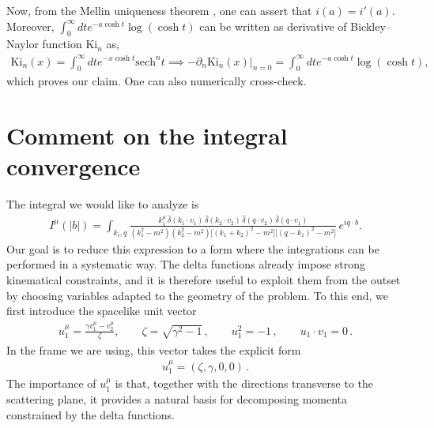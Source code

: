 Now, from the Mellin uniqueness theorem \cite{Butzer1997Mellin}, one can assert that $i(a)=i'(a)$.
Moreover, $\int_0^\infty dt e^{-a \cosh t}\log(\cosh t)$ can be written as derivative of Bickley–Naylor function $\textrm{Ki}_n$ as,
\begin{align}
    \textrm{Ki}_n(x)=\int_0^\infty dt e^{-x \cosh t} \textrm{sech}^nt\implies  -\partial_n\textrm{Ki}_n(x)|_{n=0}=\int_0^\infty dt e^{-a \cosh t}\log(\cosh t),
\end{align}
which proves our claim. One can also numerically cross-check.
\section{Comment on the integral convergence}\label{App:3.H}
The integral we would like to analyze is
\begin{align}
I^{\mu}(|b|)
=
\int_{k_i,q}
\frac{
k_1^\mu\,
\hat\delta(k_1\!\cdot\! v_1)\,
\hat\delta(k_2\!\cdot\! v_2)\,
\hat\delta(q\!\cdot\! v_2)\,
\hat\delta(q\!\cdot\! v_1)
}{
(k_1^2-m^2)(k_2^2-m^2)\bigl[(k_1+k_2)^2-m^2\bigr]\bigl[(q-k_1)^2-m^2\bigr]
}
\,e^{iq\cdot b}.
\end{align}
Our goal is to reduce this expression to a form where the integrations can be performed in a systematic way. The delta functions already impose strong kinematical constraints, and it is therefore useful to exploit them from the outset by choosing variables adapted to the geometry of the problem.
To this end, we first introduce the spacelike unit vector
\begin{align}
u_1^\mu
=
\frac{\gamma v_1^\mu-v_2^\mu}{\zeta},
\qquad
\zeta=\sqrt{\gamma^2-1}\,,
\qquad
u_1^2=-1\,,
\qquad
u_1\cdot v_1=0\,.
\end{align}
In the frame we are using, this vector takes the explicit form
\begin{align}
u_1^\mu=(\zeta,\gamma,0,0)\,.
\end{align}
The importance of $u_1^\mu$ is that, together with the directions transverse to the scattering plane, it provides a natural basis for decomposing momenta constrained by the delta functions.

